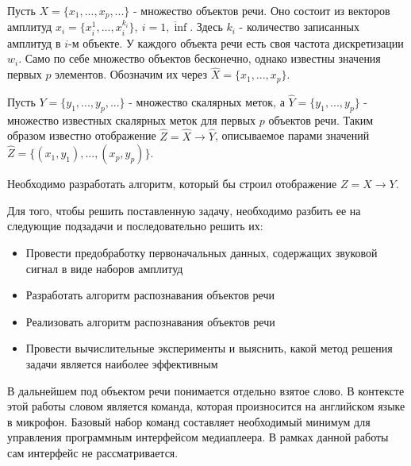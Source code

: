 Пусть $X=\{x_1, ..., x_p, ...\}$ - множество объектов речи. Оно состоит из векторов амплитуд $x_i=\{x_i^1, ..., x_i^{k_i}\},~i=\overline{1,\inf}$. Здесь $k_i$ - количество записанных амплитуд в $i$-м объекте. У каждого объекта речи есть своя частота дискретизации $w_i$. Само по себе множество объектов бесконечно, однако известны значения первых $p$ элементов. Обозначим их через $\widehat{X}=\{x_1, ..., x_p\}$.  

Пусть $Y=\{y_1, ..., y_p, ...\}$ - множество скалярных меток, а $\widehat{Y}=\{y_1, ..., y_p\}$ - множество известных скалярных меток для первых $p$ объектов речи. Таким образом известно отображение $\widehat{Z}=\widehat{X} \rightarrow \widehat{Y}$, описываемое парами значений $\widehat{Z}=\{(x_1, y_1), ..., (x_p, y_p)\}$.

Необходимо разработать алгоритм, который бы строил отображение $Z = X \rightarrow Y$.


Для того, чтобы решить поставленную задачу, необходимо разбить ее на следующие подзадачи и последовательно решить их:
\begin{itemize}[leftmargin=2cm]
\item Провести предобработку первоначальных данных, содержащих звуковой сигнал в виде наборов амплитуд
\item Разработать алгоритм распознавания объектов речи
\item Реализовать алгоритм распознавания объектов речи
\item Провести вычислительные эксперименты и выяснить, какой метод решения задачи является наиболее эффективным
\end{itemize}


В дальнейшем под объектом речи понимается отдельно взятое слово. В контексте этой работы словом является команда, которая произносится на английском языке в микрофон. Базовый набор команд составляет необходимый минимум для управления программным интерфейсом медиаплеера. В рамках данной работы сам интерфейс не рассматривается.